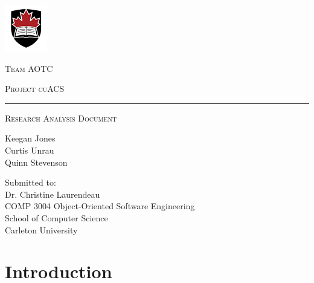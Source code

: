 \documentclass{article}
\begin{document}
\begin{center}

\par
	\includegraphics{carleton.png}\par
	\vspace{.04\textheight}
	{\LARGE\scshape Team AOTC\par}
	\vspace{.05\textheight}
	{\Huge\scshape Project cuACS\par}
	\rule{\textwidth}{0.4pt}
	{\LARGE\scshape Research Analysis Document\par}
	\vspace{.02\textheight}
	{\large Keegan Jones \\ Curtis Unrau \\ Quinn Stevenson\par}
	\vspace{.35\textheight}
	{\large Submitted to: \\ Dr. Christine Laurendeau \\ COMP 3004 Object-Oriented Software Engineering \\ School of Computer Science \\ Carleton University}
\end{center}


\tableofcontents
\listoffigures
\listoftables
\section{Introduction}
\end{document}
